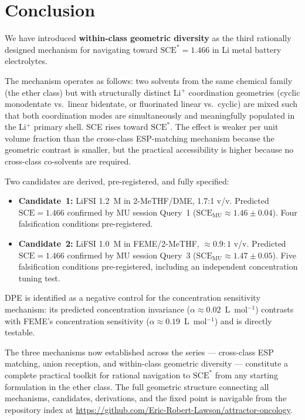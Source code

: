 \documentclass[11pt]{article}
\theoremstyle{plain}
\theoremstyle{definition}
\theoremstyle{remark}
\begin{document}
\section{Conclusion}

We have introduced \textbf{within-class geometric diversity} as the
third rationally designed mechanism for navigating toward
$\mathrm{SCE}^{*} = 1.466$ in Li metal battery electrolytes.

The mechanism operates as follows: two solvents from the same
chemical family (the ether class) but with structurally distinct
Li$^+$ coordination geometries (cyclic monodentate vs.\ linear
bidentate, or fluorinated linear vs.\ cyclic) are mixed such that
both coordination modes are simultaneously and meaningfully populated
in the Li$^+$ primary shell.  SCE rises toward $\mathrm{SCE}^{*}$.
The effect is weaker per unit volume fraction than the cross-class
ESP-matching mechanism because the geometric contrast is smaller, but
the practical accessibility is higher because no cross-class
co-solvents are required.

Two candidates are derived, pre-registered, and fully specified:

\begin{itemize}[leftmargin=2em]
  \item \textbf{Candidate~1:} LiFSI 1.2~M in 2-MeTHF/DME, 1.7:1 v/v.
        Predicted $\mathrm{SCE} = 1.466$ confirmed by MU session
        Query~1 ($\mathrm{SCE}_\mathrm{MU} \approx 1.46 \pm 0.04$).
        Four falsification conditions pre-registered.
  \item \textbf{Candidate~2:} LiFSI 1.0~M in FEME/2-MeTHF,
        $\approx 0.9:1$ v/v.  Predicted $\mathrm{SCE} = 1.466$
        confirmed by MU session Query~3
        ($\mathrm{SCE}_\mathrm{MU} \approx 1.47 \pm 0.05$).
        Five falsification conditions pre-registered, including an
        independent concentration tuning test.
\end{itemize}

DPE is identified as a negative control for the concentration
sensitivity mechanism: its predicted concentration invariance
($\alpha \approx 0.02$~L~mol$^{-1}$) contrasts with FEME's
concentration sensitivity ($\alpha \approx 0.19$~L~mol$^{-1}$)
and is directly testable.

The three mechanisms now established across the series --- cross-class
ESP matching, anion reception, and within-class geometric diversity
--- constitute a complete practical toolkit for rational navigation to
$\mathrm{SCE}^{*}$ from any starting formulation in the ether class.
The full geometric structure connecting all mechanisms, candidates,
derivations, and the fixed point is navigable from the repository
index at \url{https://github.com/Eric-Robert-Lawson/attractor-oncology}.
\end{document}
